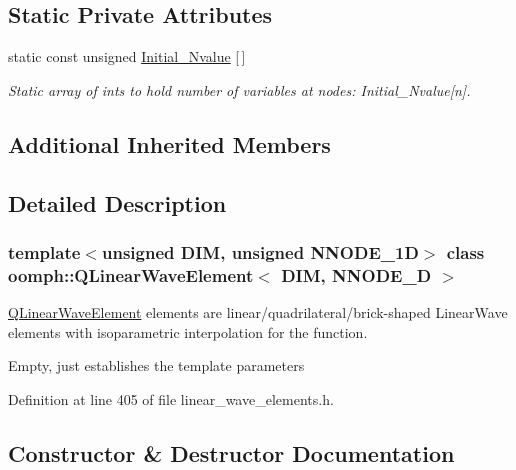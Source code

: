 \subsection*{Static Private Attributes}
\begin{DoxyCompactItemize}
\item 
static const unsigned \hyperlink{classoomph_1_1QLinearWaveElement_aa8b8b5b3e5fa3ab646fc0ce814121712}{Initial\+\_\+\+Nvalue} \mbox{[}$\,$\mbox{]}
\begin{DoxyCompactList}\small\item\em Static array of ints to hold number of variables at nodes\+: Initial\+\_\+\+Nvalue\mbox{[}n\mbox{]}. \end{DoxyCompactList}\end{DoxyCompactItemize}
\subsection*{Additional Inherited Members}


\subsection{Detailed Description}
\subsubsection*{template$<$unsigned D\+IM, unsigned N\+N\+O\+D\+E\+\_\+1D$>$\newline
class oomph\+::\+Q\+Linear\+Wave\+Element$<$ D\+I\+M, N\+N\+O\+D\+E\+\_\+D $>$}

\hyperlink{classoomph_1_1QLinearWaveElement}{Q\+Linear\+Wave\+Element} elements are linear/quadrilateral/brick-\/shaped Linear\+Wave elements with isoparametric interpolation for the function.

Empty, just establishes the template parameters 

Definition at line 405 of file linear\+\_\+wave\+\_\+elements.\+h.



\subsection{Constructor \& Destructor Documentation}
\mbox{\label{classoomph_1_1QLinearWaveElement_ad87841cc70d3f2b6b1ce5ccbf4efbd22}} 
